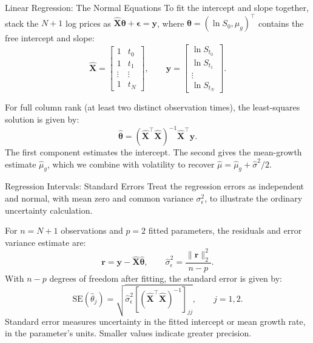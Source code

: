 \documentclass[aspectratio=169,11pt]{beamer}
\newcommand{\mug}{\mu_g}
\begin{document}
\begin{frame}{Linear Regression: The Normal Equations}
  To fit the intercept and slope together, stack the $N+1$ log prices as
  $\hat{\mathbf X}\boldsymbol\theta+\boldsymbol\epsilon=\mathbf y$, where
  $\boldsymbol\theta=(\ln S_0,\mug)^{\top}$ contains the free intercept and slope:
  \[
    \hat{\mathbf X}=
    \begin{bmatrix}1&t_0\\1&t_1\\\vdots&\vdots\\1&t_N\end{bmatrix},
    \qquad
    \mathbf y=
    \begin{bmatrix}\ln S_{t_0}\\\ln S_{t_1}\\\vdots\\\ln S_{t_N}\end{bmatrix}.
  \]

  For full column rank (at least two distinct observation times), the
  least-squares solution is given by:
  \[
    \boxed{\hat{\boldsymbol\theta}
    =(\hat{\mathbf X}^{\top}\hat{\mathbf X})^{-1}\hat{\mathbf X}^{\top}\mathbf y.}
  \]
  The first component estimates the intercept. The second gives the mean-growth
  estimate $\hat{\mu}_g$, which we combine with volatility to
  recover $\hat\mu=\hat{\mu}_g+\hat\sigma^2/2$.
\end{frame}


\begin{frame}{Regression Intervals: Standard Errors}
   Treat the regression
  errors as independent and normal, with mean zero and common variance
  $\sigma_\epsilon^2$, to illustrate the ordinary uncertainty calculation.

  \vspace{0.4em}
  For $n=N+1$ observations and $p=2$ fitted parameters, the residuals and
  error variance estimate are:
  \[
    \mathbf r=\mathbf y-\hat{\mathbf X}\hat{\boldsymbol\theta},
    \qquad
    \hat\sigma_\epsilon^2=\frac{\|\mathbf r\|_2^2}{n-p}.
  \]
  With $n-p$ degrees of freedom after fitting, the standard error is given by:
  \[
    \boxed{\mathrm{SE}(\hat\theta_j)
      =\sqrt{\hat\sigma_\epsilon^2
        \left[(\hat{\mathbf X}^{\top}\hat{\mathbf X})^{-1}\right]_{jj}},
      \qquad j=1,2.}
  \]
  Standard error measures uncertainty in the fitted intercept or mean growth
  rate, in the parameter's units. Smaller values indicate greater precision.
\end{frame}
\end{document}
